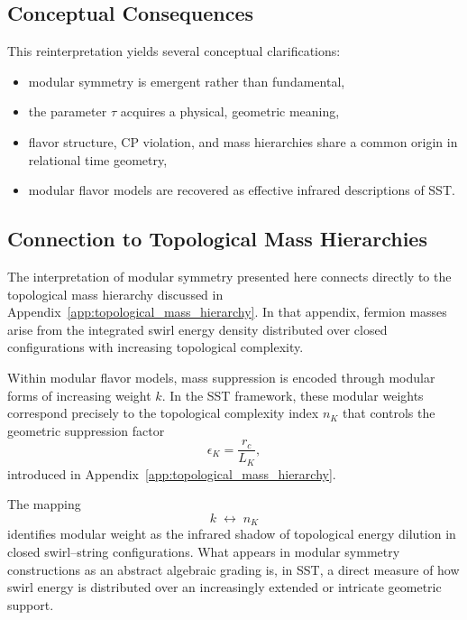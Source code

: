 \documentclass[11pt]{article}
\begin{document}
        \subsection{Conceptual Consequences}

            This reinterpretation yields several conceptual clarifications:
            \begin{itemize}
                \item modular symmetry is emergent rather than fundamental,
                \item the parameter $\tau$ acquires a physical, geometric meaning,
                \item flavor structure, CP violation, and mass hierarchies share a common origin
                in relational time geometry,
                \item modular flavor models are recovered as effective infrared descriptions of
                SST.
            \end{itemize}

        \subsection{Connection to Topological Mass Hierarchies}
            \label{app:modular_to_topological_bridge}

            The interpretation of modular symmetry presented here connects directly to the
            topological mass hierarchy discussed in Appendix~\ref{app:topological_mass_hierarchy}.
            In that appendix, fermion masses arise from the integrated swirl energy density
            distributed over closed configurations with increasing topological complexity.

            Within modular flavor models, mass suppression is encoded through modular forms
            of increasing weight $k$. In the SST framework, these modular weights correspond
            precisely to the topological complexity index $n_K$ that controls the geometric
            suppression factor
            \begin{equation}
                \epsilon_K = \frac{r_c}{L_K},
            \end{equation}
            introduced in Appendix~\ref{app:topological_mass_hierarchy}.

            The mapping
            \begin{equation}
                k \;\longleftrightarrow\; n_K
            \end{equation}
            identifies modular weight as the infrared shadow of topological energy dilution
            in closed swirl--string configurations.
            What appears in modular symmetry constructions as an abstract algebraic grading
            is, in SST, a direct measure of how swirl energy is distributed over an
            increasingly extended or intricate geometric support.
\end{document}

